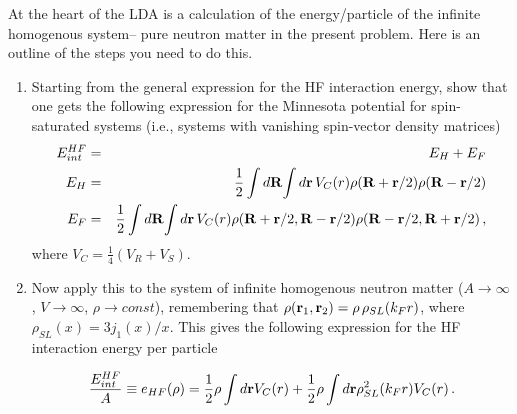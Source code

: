 At the heart of the LDA is a calculation of the energy/particle of the infinite homogenous system-- pure neutron matter in the present problem.  Here is an outline of the steps you need to do this. 
\begin{enumerate}
\item Starting from the general expression for the HF interaction energy, show that one gets the following expression for the Minnesota potential for spin-saturated systems (i.e., systems with vanishing spin-vector density matrices)
\begin{eqnarray}
E^{HF}_{int} &=& E_H + E_F\\
\label{eq:HF}
E_H &=& \frac{1}{2}\int d{\bf R}\!\int  d{\bf r}\, V_C(r)\rho({\bf R}+{\bf r}/2)\rho({\bf R}-{\bf r}/2) \nonumber\\
E_F &=&  \frac{1}{2}\int d{\bf R}\!\int  d{\bf r}\, V_C(r)\rho({\bf R}+{\bf r}/2,{\bf R}-{\bf r}/2)\rho({\bf R}-{\bf r}/2,{\bf R}+{\bf r}/2)\,, \nonumber
\end{eqnarray}
where $V_C = \frac{1}{4}(V_R + V_S)$.  

\item Now apply this to the system of infinite homogenous neutron matter ($A\rightarrow\infty$, $V\rightarrow \infty$, $\rho\rightarrow const$), remembering that $\rho({\bf r}_1,{\bf r}_2) = \rho\, \rho_{SL}(k_Fr)$, where $\rho_{SL}(x) = 3j_1(x)/x$. This gives the following expression for the HF interaction energy per particle 

\begin{equation}
\frac{E^{HF}_{int}}{A} \equiv e_{HF}(\rho) = \frac{1}{2}\rho \int d{\bf r} V_C(r)  + \frac{1}{2}\rho \int d{\bf r}\rho_{SL}^2(k_Fr)V_C(r)\,.
\end{equation}


\end{enumerate}
